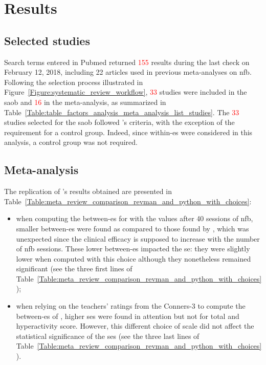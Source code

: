 


\section{Results}

\subsection{Selected studies}

Search terms entered in Pubmed returned \textcolor{red}{155} results during the last check on February 12, 2018, including 22 
articles used in previous meta-analyses on \gls{nfb}. Following the selection process illustrated 
in Figure~\ref{Figure:systematic_review_workflow}, \textcolor{red}{33} studies were included in the \gls{saob} and \textcolor{red}{16} in the meta-analysis, 
as summarized in Table~\ref{Table:table_factors_analysis_meta_analysis_list_studies}. The \textcolor{red}{33} studies selected for the \gls{saob} 
followed \citeauthor{Cortese2016}'s criteria, with the exception of the requirement for a control group. 
Indeed, since within-\gls{es} were considered in this analysis, a control group was not required.

\subsection{Meta-analysis}

The replication of \citeauthor{Cortese2016}'s results obtained are presented 
in Table~\ref{Table:meta_review_comparison_revman_and_python_with_choices}:

\begin{itemize}
    \item when computing the between-\gls{es} for \citet{Arnold2014} with the values after 40 sessions of \gls{nfb}, 
      smaller between-\gls{es} were found as compared to those found by \citet{Cortese2016}, which was unexpected since  
			the clinical efficacy is supposed to increase with the number of \gls{nfb} sessions. These lower between-\gls{es}
			impacted the \gls{se}: they were slightly lower when computed with this choice although they nonetheless remained significant (see the three first lines 
			of Table~\ref{Table:meta_review_comparison_revman_and_python_with_choices});  
    \item when relying on the teachers' ratings from the Conners-3 to compute the between-\gls{es} of \citet{Steiner2014}, 
		higher \glspl{se} were found in attention but not for total and hyperactivity score. However, this different choice of 
		scale did not affect the statistical significance of the \glspl{se} (see the three last lines 
			of Table~\ref{Table:meta_review_comparison_revman_and_python_with_choices}).
\end{itemize}

